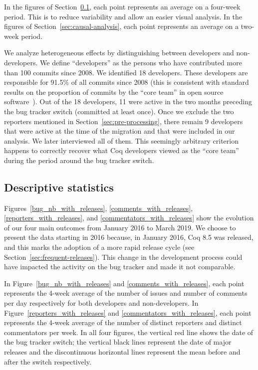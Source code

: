 In the figures of Section~\ref{sec:descriptive-stats}, each point represents an average on a four-week period. This is to reduce variability and allow an easier visual analysis. In the figures of Section~\ref{sec:causal-analysis}, each point represents an average on a two-week period.

We analyze heterogeneous effects by distinguishing between developers and non-developers. We define ``developers'' as the persons who have contributed more than 100 commits since 2008. We identified 18 developers. These developers are responsible for 91.5\% of all commits since 2008 (this is consistent with standard results on the proportion of commits by the ``core team'' in open source software~\cite{robles2009evolution}). Out of the 18 developers, 11 were active in the two months preceding the bug tracker switch (committed at least once). Once we exclude the two reporters mentioned in Section~\ref{sec:pre-processing}, there remain 9 developers that were active at the time of the migration and that were included in our analysis. We later interviewed all of them.
This seemingly arbitrary criterion happens to correctly recover what Coq developers viewed as the ``core team'' during the period around the bug tracker switch.

\subsection{Descriptive statistics}

\label{sec:descriptive-stats}

Figures~\ref{bug_nb_with_releases}, \ref{comments_with_releases}, \ref{reporters_with_releases}, and \ref{commentators_with_releases} show the evolution of our four main outcomes from January 2016 to March 2019.
We choose to present the data starting in 2016 because, in January 2016, Coq 8.5 was released, and this marks the adoption of a more rapid release cycle (see Section~\ref{sec:frequent-releases}).
This change in the development process could have impacted the activity on the bug tracker and made it not comparable.

In Figure~\ref{bug_nb_with_releases} and \ref{comments_with_releases}, each point represents the 4-week average of the number of issues and number of comments per day respectively for both developers and non-developers.
In Figure~\ref{reporters_with_releases} and \ref{commentators_with_releases}, each point represents the 4-week average of the number of distinct reporters and distinct commentators per week.
In all four figures, the vertical red line shows the date of the bug tracker switch; the vertical black lines represent the date of major releases and the discontinuous horizontal lines represent the mean before and after the switch respectively. 

